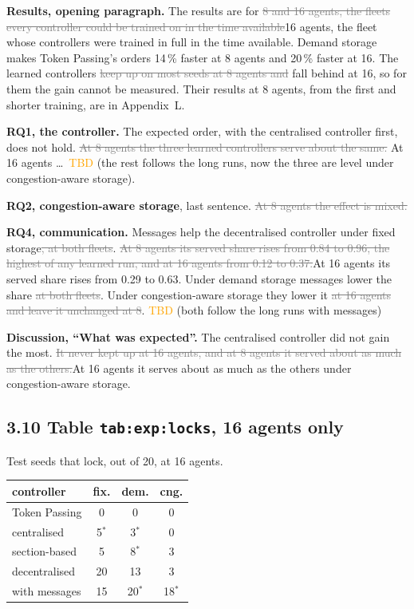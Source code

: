 \documentclass[11pt,a4paper]{article}
\newcommand{\new}[1]{\textcolor{newc}{#1}}
\newcommand{\old}[1]{\textcolor{gray}{\sout{#1}}}
\newcommand{\tbd}{\textcolor{orange}{TBD}}
\begin{document}
\textbf{Results, opening paragraph.}
The results are for \old{8 and 16 agents, the fleets every controller could
be trained on in the time available}\new{16 agents, the fleet whose
controllers were trained in full in the time available}. Demand storage
makes Token Passing's orders 14\,\% faster at 8 agents and 20\,\% faster at
16. The learned controllers \old{keep up on most seeds at 8 agents and}
fall behind at 16, so for them the gain cannot be measured. \new{Their
results at 8 agents, from the first and shorter training, are in
Appendix~L.}

\textbf{RQ1, the controller.} The expected order, with the centralised
controller first, does not hold. \old{At 8 agents the three learned
controllers serve about the same.} At 16 agents \dots\ \tbd{} (the rest
follows the long runs, now the three are level under congestion-aware
storage).

\textbf{RQ2, congestion-aware storage}, last sentence. \old{At 8 agents the
effect is mixed.}

\textbf{RQ4, communication.} Messages help the decentralised controller
under fixed storage\old{, at both fleets}. \old{At 8 agents its served share
rises from 0.84 to 0.96, the highest of any learned run, and at 16 agents
from 0.12 to 0.37.}\new{At 16 agents its served share rises from 0.29 to
0.63.} Under demand storage messages lower the share\old{ at both fleets}.
Under congestion-aware storage they lower it\old{ at 16 agents and leave it
unchanged at 8}. \tbd{} (both follow the long runs with messages)

\textbf{Discussion, ``What was expected''.} The centralised controller did
not gain the most. \old{It never kept up at 16 agents, and at 8 agents it
served about as much as the others.}\new{At 16 agents it serves about as
much as the others under congestion-aware storage.}

\subsection*{3.10 Table \texttt{tab:exp:locks}, 16 agents only}

\begin{table}[H]\centering\small
Test seeds that lock, out of 20, at 16 agents.\par\smallskip
\begin{tabular}{l ccc}
\toprule
controller & fix. & dem. & cng.\\
\midrule
Token Passing & 0 & 0 & 0\\
centralised & 5$^\ast$ & 3$^\ast$ & 0\\
section-based & 5 & 8$^\ast$ & 3\\
decentralised & 20 & 13 & 3\\
with messages & 15 & 20$^\ast$ & 18$^\ast$\\
\bottomrule
\end{tabular}
\end{table}
\end{document}
